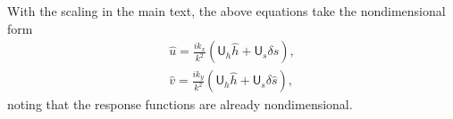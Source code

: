 \documentclass[paper=a4, fontsize=11pt]{article} %
\begin{document}
With the scaling in the main text, the above equations
take the nondimensional form
\begin{eqnarray}
\widehat{u} =  \frac{ik_x}{k^2}\left(\mathsf{U}_h\widehat{h} +  \mathsf{U}_s\delta\widehat{s}\right), \label{uHf}\\
\widehat{v} = \frac{ik_y}{k^2}\left(\mathsf{U}_h\widehat{h} +  \mathsf{U}_s\delta\widehat{s}\right),\label{vHf}
\end{eqnarray}
noting that the response functions are already nondimensional.
\end{document}
